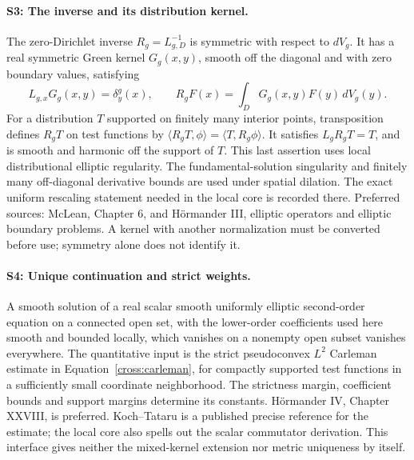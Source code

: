 \documentclass[11pt]{article}
\theoremstyle{definition}
\theoremstyle{remark}
\numberwithin{equation}{section}
\begin{document}
\paragraph{S3: The inverse and its distribution kernel.}
The zero-Dirichlet inverse $R_g=L_{g,D}^{-1}$ is symmetric with respect
to $dV_g$. It has a real symmetric Green kernel $G_g(x,y)$, smooth off
the diagonal and with zero boundary values, satisfying
\[
 L_{g,x}G_g(x,y)=\delta_y^g(x),\qquad
 R_gF(x)=\int_DG_g(x,y)F(y)\,dV_g(y).
\]
For a distribution $T$ supported on finitely many interior points,
transposition defines $R_gT$ on test functions by
$\langle R_gT,\phi\rangle=\langle T,R_g\phi\rangle$.
It satisfies $L_gR_gT=T$, and is smooth and harmonic off the support
of $T$. This last assertion uses local distributional elliptic regularity.
The fundamental-solution singularity and finitely many off-diagonal
derivative bounds are used under spatial dilation. The exact uniform
rescaling statement needed in the local core is recorded there.
Preferred sources: McLean, Chapter 6, and H\"ormander III, elliptic
operators and elliptic boundary problems. A kernel with another normalization
must be converted before use; symmetry alone does not identify it.

\paragraph{S4: Unique continuation and strict weights.}
A smooth solution of a real scalar smooth uniformly elliptic second-order
equation on a connected open set, with the lower-order coefficients used
here smooth and bounded locally, which vanishes on a nonempty open subset
vanishes everywhere. The quantitative input is the strict pseudoconvex
$L^2$ Carleman estimate in Equation~\eqref{cross:carleman}, for compactly
supported test functions in a sufficiently small coordinate neighborhood.
The strictness margin, coefficient bounds and support margins determine
its constants. H\"ormander IV, Chapter XXVIII, is preferred.
Koch--Tataru \cite[Definition 8.3 and Theorem 9(a)]{KochTataru2005}
is a published precise reference for the estimate; the local core also
spells out the scalar commutator derivation. This interface gives neither
the mixed-kernel extension nor metric uniqueness by itself.
\end{document}
